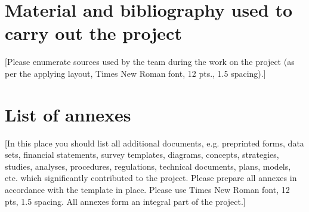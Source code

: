 \section{Material and bibliography used to carry out the project}\label{sec:material-and-bibliography-used-to-carry-out-the-project}
[Please enumerate sources used by the team during the work on the project (as per the applying layout, Times New Roman font, 12 pts., 1.5 spacing).]

\section{List of annexes}\label{sec:list-of-annexes}
[In this place you should list all additional documents, e.g. preprinted forms, data sets, financial statements, survey templates, diagrams,
    concepts, strategies, studies, analyses, procedures, regulations, technical documents, plans, models, etc. which significantly contributed to the project.
Please prepare all annexes in accordance with the template in place.
Please use Times New Roman font, 12 pts, 1.5 spacing.
All annexes form an integral part of the project.]

